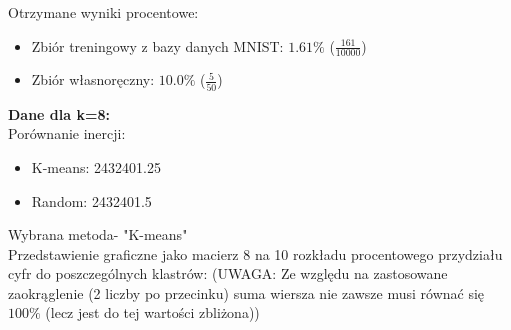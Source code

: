 \documentclass[a4paper,14pt]{report}
\begin{document}
	Otrzymane wyniki procentowe:
	\begin{itemize}
		\item Zbiór treningowy z bazy danych MNIST: $1.61\%$ ($\frac{161}{10000}$)
		\item Zbiór własnoręczny: $10.0\%$ ($\frac{5}{50}$)
	\end{itemize}
	\textbf{Dane dla k=8: } \\
	Porównanie inercji: 
	\begin{itemize}
		\item K-means: 2432401.25
		\item Random: 2432401.5
	\end{itemize}
	Wybrana metoda- "K-means" \\
	Przedstawienie graficzne jako macierz 8 na 10 rozkładu procentowego przydziału cyfr do poszczególnych klastrów:
	(UWAGA: Ze względu na zastosowane zaokrąglenie (2 liczby po przecinku) suma wiersza nie zawsze musi równać się $100\%$ (lecz jest do tej wartości zbliżona))
\end{document}
